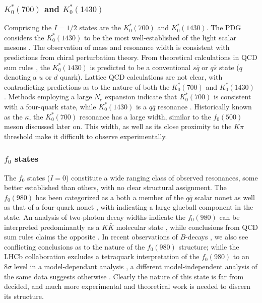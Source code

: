\documentclass[aps,prd,onecolumn,showpacs,amsmath,amssymb,nofootinbib]{revtex4} \pdfoutput=1
\begin{document}
\subsubsection{$K^{*}_{0}(700)$ and $K^{*}_{0}(1430)$}
Comprising the $I = 1/2$ states are the $K^{*}_{0}(700)$ and $K^{*}_{0}(1430)$. The PDG considers the $K^{*}_{0}(1430)$ to be the most well-established of the light scalar mesons \cite{PDG2018}. The observation of mass and resonance width is consistent with predictions from chiral perturbation theory. From theoretical calculations in QCD sum rules \cite{Narison2000,Du2005}, the $K^{*}_{0}(1430)$ is predicted to be a conventional $s\bar{q}$ or $q\bar{s}$ state ($q$ denoting a $u$ or $d$ quark). Lattice QCD calculations are not clear, with contradicting predictions as to the nature of both the $K^{*}_{0}(700)$ and $K^{*}_{0}(1430)$ \cite{Prelovsek2010,Alexandrou2013}. Methods employing a large $N_c$ expansion indicate that $K^{*}_{0}(700)$ is consistent with a four-quark state, while $K^{*}_{0}(1430)$ is a $q\bar q$ resonance \cite{Giacosa2008}.
Historically known as the $\kappa$, the $K^{*}_{0}(700)$ resonance has a large width, similar to the $f_0(500)$ meson discussed later on. This width, as well as its close proximity to the $K\pi$ threshold make it difficult to observe experimentally.

\subsubsection{$f_0$ states}
The $f_0$ states ($I=0$) constitute a wide ranging class of observed resonances, some better established than others, with no clear structural assignment. The $f_0(980)$ has been categorized as a both a member of the $q\bar{q}$ scalar nonet \cite{Tornqvist1996,Shi1999} as well as that of a four-quark nonet \cite{Black1999,Markushin2000,Fariborz2003}, with \cite{Fariborz2003} indicating a large glueball component in the state. An analysis of two-photon decay widths indicate the $f_0(980)$ can be interpreted predominantly as a $K\bar{K}$ molecular state \cite{Lemmer2007}, while conclusions from QCD sum rules claims the opposite \cite{Lee2013}. In recent observations of $B$-decays \cite{Aaij2014,Daub2015}, we also see conflicting conclusions as to the nature of the $f_0(980)$ structure; while the LHCb collaboration excludes a tetraquark interpretation of the $f_0(980)$ to an $8\sigma$ level in a model-dependant analysis \cite{Aaij2014}, a different model-independent analysis of the same data suggests otherwise \cite{Daub2015}.  Clearly the nature of this state is far from decided, and much more experimental and theoretical work is needed to discern its structure.
\end{document}

